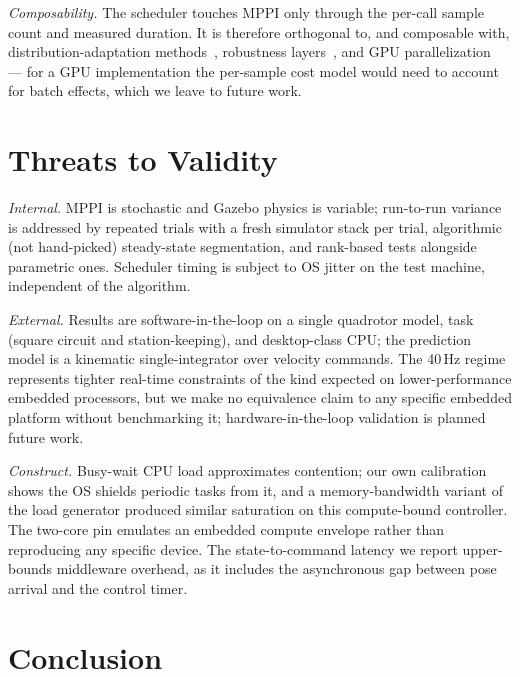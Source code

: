 \documentclass[conference]{IEEEtran}
\begin{document}
\emph{Composability.} The scheduler touches MPPI only through the
per-call sample count and measured duration. It is therefore orthogonal
to, and composable with, distribution-adaptation
methods~\cite{asmar2023mpopis,mohamed2022logmppi}, robustness
layers~\cite{gandhi2021robust,yin2023shield}, and GPU
parallelization~\cite{minarik2024mppi,enrico2025comparison} --- for a
GPU implementation the per-sample cost model would need to account for
batch effects, which we leave to future work.

\section{Threats to Validity}
\label{sec:threats}

\emph{Internal.} MPPI is stochastic and Gazebo physics is variable;
run-to-run variance is addressed by repeated trials with a fresh
simulator stack per trial, algorithmic (not hand-picked) steady-state
segmentation, and rank-based tests alongside parametric ones. Scheduler
timing is subject to OS jitter on the test machine, independent of the
algorithm.

\emph{External.} Results are software-in-the-loop on a single quadrotor
model, task (square circuit and station-keeping), and desktop-class CPU;
the prediction model is a kinematic single-integrator over velocity
commands. The 40\,Hz regime represents tighter real-time constraints of
the kind expected on lower-performance embedded processors, but we make
no equivalence claim to any specific embedded platform without
benchmarking it; hardware-in-the-loop validation is planned future work.

\emph{Construct.} Busy-wait CPU load approximates contention; our own
calibration shows the OS shields periodic tasks from it, and a
memory-bandwidth variant of the load generator produced similar
saturation on this compute-bound controller. The two-core pin emulates
an embedded compute envelope rather than reproducing any specific
device. The state-to-command latency we report upper-bounds middleware
overhead, as it includes the asynchronous gap between pose arrival and
the control timer.

\section{Conclusion}
\label{sec:conclusion}
\end{document}
